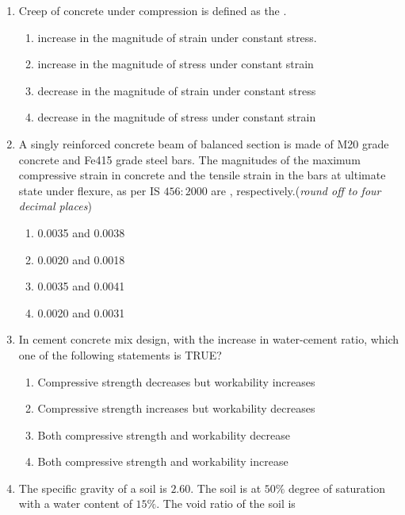 \documentclass[journal,12pt,onecolumn]{IEEEtran}
\theoremstyle{remark}
\begin{document}
\begin{enumerate}
\item Creep of concrete under compression is defined as the \underline{\hspace{2cm}}.

\hfill{}
\begin{enumerate}
\item increase in the magnitude of strain under constant stress.
\item increase in the magnitude of stress under constant strain
\item decrease in the magnitude of strain under constant stress
\item decrease in the magnitude of stress under constant strain
\end{enumerate}

\item A singly reinforced concrete beam of balanced section is made of M20 grade concrete and Fe415 grade steel bars. The magnitudes of the maximum compressive strain in concrete and the tensile strain in the bars at ultimate state under flexure, as per IS $456: 2000$ are \underline{\hspace{2cm}}, respectively.(\textit{round off to four decimal places})

\hfill{}
\begin{enumerate}
\item 0.0035 and 0.0038
\item 0.0020 and 0.0018
\item 0.0035 and 0.0041
\item 0.0020 and 0.0031
\end{enumerate}

\item In cement concrete mix design, with the increase in water-cement ratio, which one of the following statements is TRUE?

\hfill{}
\begin{enumerate}
\item Compressive strength decreases but workability increases
\item Compressive strength increases but workability decreases
\item Both compressive strength and workability decrease
\item Both compressive strength and workability increase
\end{enumerate}

\item The specific gravity of a soil is $2.60$. The soil is at $50\%$ degree of saturation with a water content of $15\%$. The void ratio of the soil is \underline{\hspace{2cm}}


\end{enumerate}
\end{document}
